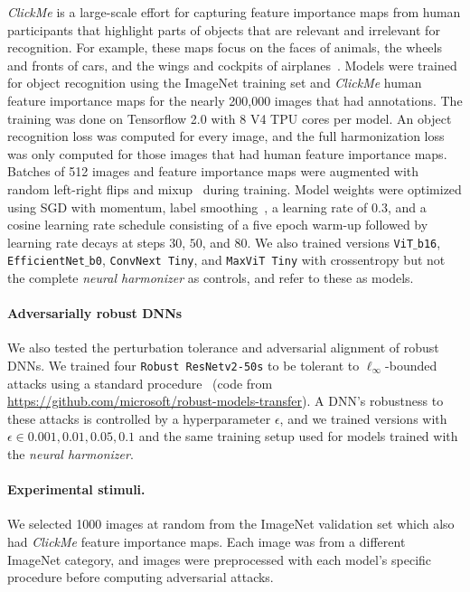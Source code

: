 \documentclass{article}
\theoremstyle{plain}
\theoremstyle{definition}
\theoremstyle{remark}
\begin{document}
\emph{ClickMe} is a large-scale effort for capturing feature importance maps from human participants that highlight parts of objects that are relevant and irrelevant for recognition. For example, these maps focus on the faces of animals, the wheels and fronts of cars, and the wings and cockpits of airplanes~\cite{Linsley2019-ew}. Models were trained for object recognition using the ImageNet training set and \textit{ClickMe} human feature importance maps for the nearly 200,000 images that had annotations. The training was done on Tensorflow 2.0 with 8 V4 TPU cores per model. An object recognition loss was computed for every image, and the full harmonization loss was only computed for those images that had human feature importance maps. Batches of 512 images and feature importance maps were augmented with random left-right flips and mixup~\cite{Zhang2017-hw} during training. Model weights were optimized using SGD with momentum, label smoothing~\cite{Muller2019-td}, a learning rate of $0.3$, and a cosine learning rate schedule consisting of a five epoch warm-up followed by learning rate decays at steps $30$, $50$, and $80$. We also trained versions \texttt{ViT$\_$b16}, \texttt{EfficientNet$\_$b0}, \texttt{ConvNext Tiny}, and \texttt{MaxViT Tiny} with crossentropy but not the complete \emph{neural harmonizer} as controls, and refer to these as {\color{baseline}{harmonizer control}} models.

\paragraph{Adversarially robust DNNs}
We also tested the perturbation tolerance and adversarial alignment of robust DNNs. We trained four \texttt{Robust ResNetv2-50s} to be tolerant to $\ell_{\infty}$-bounded attacks using a standard procedure~\cite{PGD_madrytowards,Salman2020-lo} (code from \url{https://github.com/microsoft/robust-models-transfer}). A DNN's robustness to these attacks is controlled by a hyperparameter $\epsilon$, and we trained versions with $\epsilon \in {0.001, 0.01, 0.05, 0.1}$ and the same training setup used for models trained with the \emph{neural harmonizer}.

\paragraph{Experimental stimuli.}
We selected 1000 images at random from the ImageNet validation set which also had \emph{ClickMe} feature importance maps. Each image was from a different ImageNet category, and images were preprocessed with each model's specific procedure before computing adversarial attacks.
\end{document}

